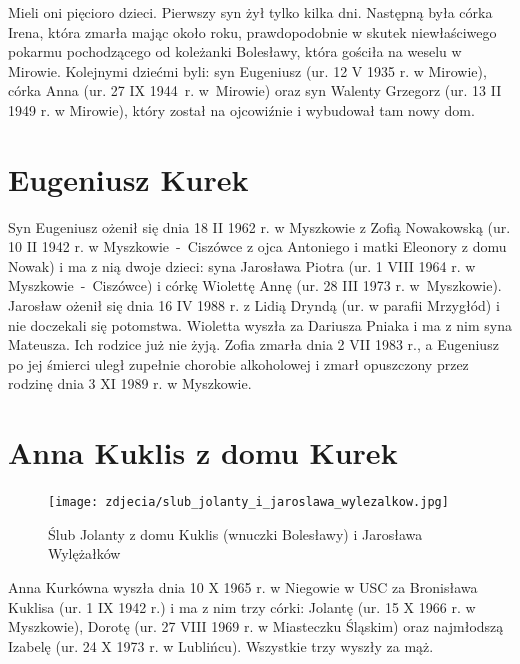 Mieli oni pięcioro dzieci. Pierwszy syn żył tylko kilka dni. Następną była córka Irena, która zmarła mając około roku, prawdopodobnie w skutek niewłaściwego pokarmu pochodzącego od koleżanki Bolesławy, która gościła na weselu w Mirowie.
Kolejnymi dziećmi byli: syn Eugeniusz (ur. 12 V 1935 r. w Mirowie), córka Anna (ur. 27 IX 1944~r. w~Mirowie) oraz syn Walenty Grzegorz (ur. 13 II 1949 r. w Mirowie), który został na ojcowiźnie i wybudował tam nowy dom.







\section{Eugeniusz Kurek}

Syn Eugeniusz ożenił się dnia 18 II 1962 r. w Myszkowie z Zofią Nowakowską (ur. 10 II 1942 r. w Myszkowie~-~Ciszówce z ojca Antoniego i matki Eleonory z domu Nowak) i ma z nią dwoje dzieci: syna Jarosława Piotra (ur. 1 VIII 1964 r. w Myszkowie~-~Ciszówce) i córkę Wiolettę Annę (ur. 28 III 1973 r. w~Myszkowie). Jarosław ożenił się dnia 16 IV 1988 r. z Lidią Dryndą (ur. w parafii Mrzygłód) i nie doczekali się potomstwa. Wioletta wyszła za Dariusza Pniaka i ma z nim syna Mateusza. Ich rodzice już nie żyją. Zofia zmarła dnia 2 VII 1983 r., a Eugeniusz po jej śmierci uległ zupełnie chorobie alkoholowej i zmarł opuszczony przez rodzinę dnia 3 XI 1989 r. w Myszkowie.




\section{Anna Kuklis z domu Kurek}

\begin{figure}[!h]
\begin{center}
\texttt{[image: zdjecia/slub\_jolanty\_i\_jaroslawa\_wylezalkow.jpg]}
\caption[Ślub Jolanty Kuklis z Jarosławem Wylężałkiem]{Ślub Jolanty z domu Kuklis (wnuczki Bolesławy) i Jarosława Wylężałków}
\label{rys:slub_jolanty_i_jaroslawa_wylezalkow}
\end{center}
\end{figure}

Anna Kurkówna wyszła dnia 10 X 1965 r. w Niegowie w USC za Bronisława Kuklisa (ur. 1 IX 1942 r.) i ma z nim trzy córki: Jolantę (ur. 15 X 1966 r. w Myszkowie), Dorotę (ur. 27 VIII 1969 r. w Miasteczku Śląskim) oraz najmłodszą Izabelę (ur. 24 X 1973 r. w Lublińcu). Wszystkie trzy wyszły za mąż.

